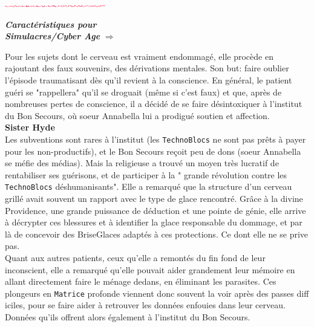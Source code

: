 \documentclass[11pt,twoside,a4paper]{article}
\def\barreCyberAgeThird{\includegraphics[width=0.33\textwidth]{img/Filet_CA.png}}
\begin{document}
\begin{multicols*}{3}
{	\barreCyberAgeThird~\\
	
	\begin{minipage}[ht]{0.30\textwidth}
		\colorbox{verylightgrey}{ \footnotesize %
		\begin{minipage}[ht]{1.00\textwidth}
			\textbf{\large \emph{Caract{\'e}ristiques pour ~\\ Simulacres/Cyber Age}} %
			$\Longrightarrow$
		\end{minipage} } %
	\end{minipage}
		
	\vfill
	\columnbreak
	
	Pour les sujets dont le cerveau est vraiment endommag{\'e}, elle proc{\`e}de en rajoutant des faux souvenirs, des d{\'e}rivations mentales. Son but: faire oublier l'{\'e}pisode traumatisant d{\`e}s qu'il revient {\`a} la conscience. En g{\'e}n{\'e}ral, le patient gu{\'e}ri se "rappellera" qu'il se droguait (m{\^e}me si c'est faux) et que, apr{\`e}s de nombreuses pertes de conscience, il a d{\'e}cid{\'e} de se faire d{\'e}sintoxiquer {\`a} l'institut du Bon Secours, o{\`u} soeur Annabella lui a prodigu{\'e} soutien et affection.~\\
	
	\textbf{\Large Sister Hyde}~\\
	
	Les subventions sont rares {\`a} l'institut (les \texttt{TechnoBlocs} ne sont pas pr{\^e}ts {\`a} payer pour les non-productifs), et le Bon Secours re\c{c}oit peu de dons (soeur Annabella se m{\'e}fie des m{\'e}dias). Mais la religieuse a trouv{\'e} un moyen tr{\`e}s lucratif de rentabiliser ses gu{\'e}risons, et de participer {\`a} la " grande r{\'e}volution contre les \texttt{TechnoBlocs} d{\'e}shumanisants". Elle a remarqu{\'e} que la structure d'un cerveau grill{\'e} avait souvent un rapport avec le type de glace rencontr{\'e}. Gr{\^a}ce {\`a} la divine Providence, une grande puissance de d{\'e}duction et une pointe de g{\'e}nie, elle arrive {\`a} d{\'e}crypter ces blessures et {\`a} identifier la glace responsable du dommage, et par l{\`a} de concevoir des BriseGlaces adapt{\'e}s {\`a} ces protections. Ce dont elle ne se prive pas.~\\
	
	Quant aux autres patients, ceux qu'elle a remont{\'e}s du fin fond de leur inconscient, elle a remarqu{\'e} qu'elle pouvait aider grandement leur m{\'e}moire en allant directement faire le m{\'e}nage dedans, en {\'e}liminant les parasites. Ces plongeurs en \texttt{Matrice} profonde viennent donc souvent la voir apr{\`e}s des passes diff iciles, pour se faire aider {\`a} retrouver les donn{\'e}es enfouies dans leur cerveau. Donn{\'e}es qu'ils offrent alors {\'e}galement {\`a} l'institut du Bon Secours.~\\
	
}
\end{multicols*}
\end{document}
